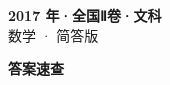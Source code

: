 \documentclass[zihao=-4, a4paper]{ctexart}
\begin{document}
\begin{center}
  {\Large\bfseries 2017 年·全国Ⅱ卷·文科}\\[4pt]
  {\large 数学 · 简答版}
\end{center}
\medskip
{}

\clearpage
{}
\begin{center}{\Large\bfseries 答案速查}\end{center}
\medskip

\end{document}
